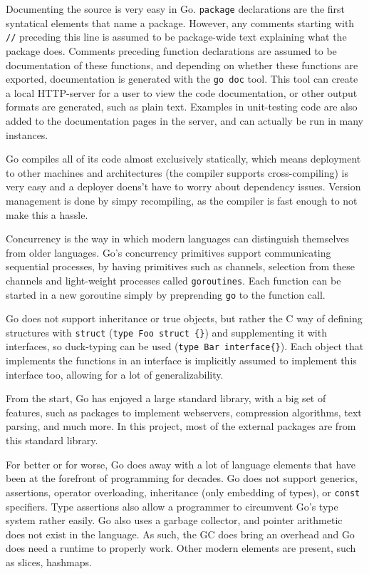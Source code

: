 \documentclass[]{article}
\begin{document}
Documenting the source is very easy in Go. \texttt{package} declarations
are the first syntatical elements that name a package. However, any
comments starting with \texttt{//} preceding this line is assumed to be
package-wide text explaining what the package does. Comments preceding
function declarations are assumed to be documentation of these
functions, and depending on whether these functions are exported,
documentation is generated with the \texttt{go doc} tool. This tool can
create a local HTTP-server for a user to view the code documentation, or
other output formats are generated, such as plain text. Examples in
unit-testing code are also added to the documentation pages in the
server, and can actually be run in many instances.

Go compiles all of its code almost exclusively statically, which means
deployment to other machines and architectures (the compiler supports
cross-compiling) is very easy and a deployer doens't have to worry about
dependency issues. Version management is done by simpy recompiling, as
the compiler is fast enough to not make this a hassle.

Concurrency is the way in which modern languages can distinguish
themselves from older languages. Go's concurrency primitives support
communicating sequential processes, by having primitives such as
channels, selection from these channels and light-weight processes
called \texttt{goroutines}. Each function can be started in a new
goroutine simply by preprending \texttt{go} to the function call.

Go does not support inheritance or true objects, but rather the C way of
defining structures with \texttt{struct} (\texttt{type Foo struct \{\}})
and supplementing it with interfaces, so duck-typing can be used
(\texttt{type Bar interface\{\}}). Each object that implements the
functions in an interface is implicitly assumed to implement this
interface too, allowing for a lot of generalizability.

From the start, Go has enjoyed a large standard library, with a big set
of features, such as packages to implement webservers, compression
algorithms, text parsing, and much more. In this project, most of the
external packages are from this standard library.

For better or for worse, Go does away with a lot of language elements
that have been at the forefront of programming for decades. Go does not
support generics, assertions, operator overloading, inheritance (only
embedding of types), or \texttt{const} specifiers. Type assertions also
allow a programmer to circumvent Go's type system rather easily. Go also
uses a garbage collector, and pointer arithmetic does not exist in the
language. As such, the GC does bring an overhead and Go does need a
runtime to properly work. Other modern elements are present, such as
slices, hashmaps.
\end{document}
